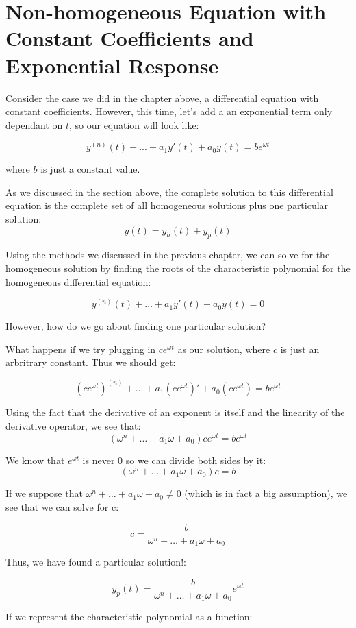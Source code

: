 \documentclass{report}
\begin{document}
\section{Non-homogeneous Equation with Constant Coefficients and Exponential Response}

Consider the case we did in the chapter above, a differential equation with constant coefficients. However, this time, let's add a an exponential term only dependant on $t$, so our equation will look like:

$$y^{(n)}(t) + ... + a_1y'(t) + a_0y(t) = be^{\omega t}$$

where $b$ is just a constant value.

As we discussed in the section above, the complete solution to this differential equation is the complete set of all homogeneous solutions plus one particular solution:
$$y(t) = y_h(t) + y_p(t)$$

Using the methods we discussed in the previous chapter, we can solve for the homogeneous solution by finding the roots of the characteristic polynomial for the homogeneous differential equation:

$$y^{(n)}(t) + \dots + a_1y'(t) + a_0y(t) = 0$$

However, how do we go about finding one particular solution?

What happens if we try plugging in $ce^{\omega t}$ as our solution, where $c$ is just an arbritrary constant. Thus we should get:

$$(ce^{\omega t})^{(n)} + \dots + a_1(ce^{\omega t})' + a_0(ce^{\omega t}) = be^{\omega t}$$

Using the fact that the derivative of an exponent is itself and the linearity of the derivative operator, we see that:
$$(\omega^n + \dots + a_1\omega + a_0)ce^{\omega t} = be^{\omega t}$$

We know that $e^{\omega t}$ is never 0 so we can divide both sides by it:
$$(\omega^n + \dots + a_1\omega + a_0)c = b$$

If we suppose that $\omega^n + \dots + a_1\omega + a_0 \neq 0$ (which is in fact a big assumption), we see that we can solve for c:

$$c = \frac{b}{\omega^n + \dots + a_1\omega + a_0}$$

Thus, we have found a particular solution!:

$$y_p(t) =  \frac{b}{\omega^n + \dots + a_1\omega + a_0}e^{\omega t}$$

If we represent the characteristic polynomial as a function:
\end{document}
